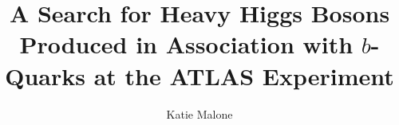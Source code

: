 \documentclass[12pt]{report}
\begin{document}
	\title{A Search for Heavy Higgs Bosons Produced in Association with $b$-Quarks at the ATLAS Experiment}
	\author{Katie Malone}


\maketitle

\tableofcontents
\listoffigures
\listoftables

%






















\end{document}
